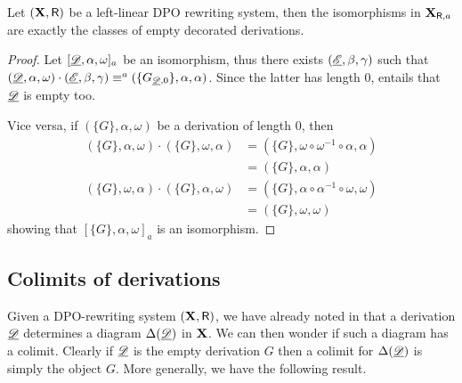 \begin{proposition} Let $(\textbf {\textup{X}}, \mathsf{R})$ be a left-linear DPO rewriting system, then the isomorphisms in $\textbf {\textup{X}}_{\mathsf{R}, a}$ are exactly the classes of empty decorated derivations.
\end{proposition}
\begin{proof}
	Let $[\underline{\mathscr{D}}, \alpha, \omega]_a$ be an isomorphism, thus there exists $(\underline{\mathscr{E}}, \beta, \gamma)$ such that $(\underline{\mathscr{D}}, \alpha, \omega)\cdot (\underline{\mathscr{E}}, \beta, \gamma)\equiv^a(\{G_{\underline{\mathscr{D}}, 0}\}, \alpha, \alpha)$. Since the latter has length $0$,  entails that $\underline{\mathscr{D}}$ is empty too.
	
	Vice versa, if $(\{G\}, \alpha, \omega)$ be a derivation of length $0$, then 
	\begin{align*}
	(\{G\}, \alpha, \omega) \cdot (\{G\}, \omega, \alpha)&=(\{G\}, \omega\circ \omega^{-1} \circ \alpha, \alpha )\\&=(\{G\}, \alpha, \alpha)\\
	(\{G\}, \omega, \alpha) \cdot (\{G\}, \alpha, \omega)&=(\{G\}, \alpha\circ \alpha^{-1} \circ \omega, \omega )\\&=(\{G\}, \omega, \omega)
	\end{align*}
	showing that  $[\{G\}, \alpha, \omega]_a$ is an isomorphism.
\end{proof}

\subsection{Colimits of derivations}\label{subsec:col}
Given a DPO-rewriting system $(\textbf {\textup{X}}, \mathsf{R})$,  we have already noted in  that a derivation $\underline{\mathscr{D}}$  determines a diagram $\Delta(\underline{\mathscr{D}})$ in $\textbf {\textup{X}}$. We can then wonder if such a diagram has a colimit. Clearly if $\underline{\mathscr{D}}$ is the empty derivation $G$ then a colimit for $\Delta(\underline{\mathscr{D}})$ is simply the object $G$. More generally, we have the following result.

